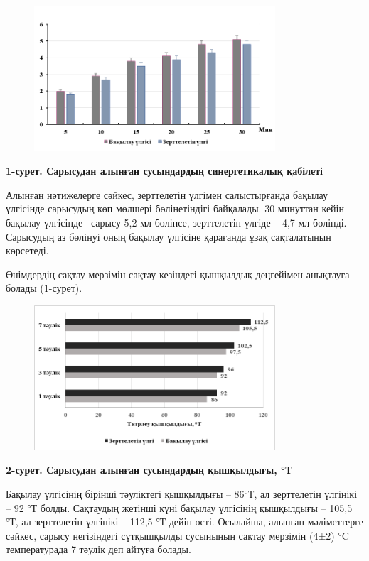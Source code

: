 {{\begin{figure}[H]
	\centering
	\includegraphics[width=0.8\textwidth]{media/pish4/image2}
	\caption*{}
\end{figure}


{\bfseries 1-сурет. Сарысудан алынған сусындардың синергетикалық қабілеті}

Алынған нәтижелерге сәйкес, зерттелетін үлгімен салыстырғанда бақылау
үлгісінде сарысудың көп мөлшері бөлінетіндігі байқалады. 30 минуттан
кейін бақылау үлгісінде --сарысу 5,2 мл бөлінсе, зерттелетін үлгіде --
4,7 мл бөлінді. Сарысудың аз бөлінуі оның бақылау үлгісіне қарағанда
ұзақ сақталатынын көрсетеді.

Өнімдердің сақтау мерзімін сақтау кезіндегі қышқылдық деңгейімен
анықтауға болады (1-сурет).

\begin{figure}[H]
	\centering
	\includegraphics[width=0.8\textwidth]{media/pish4/image3}
	\caption*{}
\end{figure}


{\bfseries 2-сурет. Сарысудан алынған сусындардың қышқылдығы, °Т}

Бақылау үлгісінің бірінші тәуліктегі қышқылдығы -- 86°Т, ал зерттелетін
үлгінікі -- 92 °Т болды. Сақтаудың жетінші күні бақылау үлгісінің
қышқылдығы -- 105,5 °Т, ал зерттелетін үлгінікі -- 112,5 °Т дейін өсті.
Осылайша, алынған мәліметтерге сәйкес, сарысу негізіндегі сүтқышқылды
сусынының сақтау мерзімін (4±2) °C температурада 7 тәулік деп айтуға
болады.

}}
